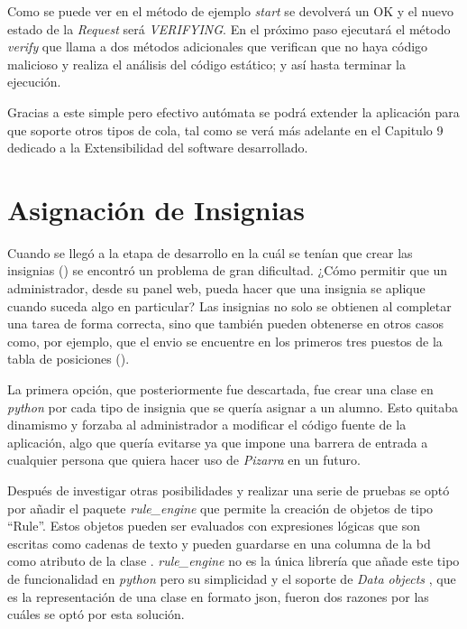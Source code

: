 \documentclass[11pt,spanish,listoffigures,listoftables]{tfgetsinf}
\begin{document}
Como se puede ver en el método de ejemplo \textit{start} se devolverá un OK y el nuevo estado de la \textit{Request} será \textit{VERIFYING}. En el próximo paso ejecutará el método \textit{verify} que llama a dos métodos adicionales que verifican que no haya código malicioso y realiza el análisis del código estático; y así hasta terminar la ejecución.

Gracias a este simple pero efectivo autómata se podrá extender la aplicación para que soporte otros tipos de \gls{cola}, tal como se verá más adelante en el Capitulo 9 dedicado a la Extensibilidad del software desarrollado.

\section{Asignación de Insignias}

Cuando se llegó a la etapa de desarrollo en la cuál se tenían que crear las \gls{insignia}s () se encontró un problema de gran dificultad. ¿Cómo permitir que un \gls{administrador}, desde su panel web, pueda hacer que una \gls{insignia} se aplique cuando suceda algo en particular? Las \gls{insignia}s no solo se obtienen al completar una \gls{tarea} de forma correcta, sino que también pueden obtenerse en otros casos como, por ejemplo, que el \gls{envio} se encuentre en los primeros tres puestos de la tabla de posiciones ().

La primera opción, que posteriormente fue descartada, fue crear una clase en \textit{python} por cada tipo de \gls{insignia} que se quería asignar a un \gls{alumno}. Esto quitaba dinamismo y forzaba al \gls{administrador} a modificar el código fuente de la aplicación, algo que quería evitarse ya que impone una barrera de entrada a cualquier persona que quiera hacer uso de \textit{Pizarra} en un futuro.

Después de investigar otras posibilidades y realizar una serie de pruebas se optó por añadir el \gls{paquete} \textit{rule\_engine} que permite la creación de objetos de tipo ``Rule''. Estos objetos pueden ser evaluados con expresiones lógicas que son escritas como cadenas de texto y pueden guardarse en una columna de la \acrshort{bd} como atributo de la clase . \textit{rule\_engine} no es la única librería que añade este tipo de funcionalidad en \textit{python} pero su simplicidad y el soporte de \textit{Data objects} \cite{link-rule-engine}, que es la representación de una clase en formato \acrshort{json}, fueron dos razones por las cuáles se optó por esta solución.
\end{document}
